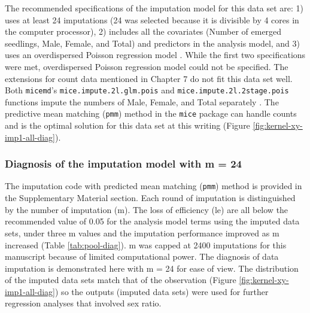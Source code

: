\documentclass[utf8]{frontiersSCNS}
\begin{document}
The recommended specifications of the imputation model for this data set are: 1) uses at least 24 imputations (24 was selected because it is divisible by 4 cores in the computer processor), 2) includes all the covariates (Number of emerged seedlings, Male, Female, and Total) and predictors in the analysis model, and 3) uses an overdispersed Poisson regression model \citetext{\citealp{azurMultipleImputationChained2011}; \citealp{whiteMultipleImputationUsing2011}; \citealp[and][]{nguyenModelCheckingMultiple2017}}. While the first two specifications were met, overdispersed Poisson regression model could not be specified. The extensions for count data mentioned in Chapter 7 \citep{vanbuurenFlexibleImputationMissing2018} do not fit this data set well. Both \texttt{micemd}'s \texttt{mice.impute.2l.glm.pois} and \texttt{mice.impute.2l.2stage.pois} functions impute the numbers of Male, Female, and Total separately \citep{audigierMicemdMultipleImputation2019}. The predictive mean matching (\texttt{pmm}) method in the \texttt{mice} package can handle counts \citep{vanbuurenMiceMultivariateImputation2011} and is the optimal solution for this data set at this writing (Figure \ref{fig:kernel-xy-imp1-all-diag}).

\hypertarget{diagnosis-of-the-imputation-model-with-m-24}{%
\subsubsection*{Diagnosis of the imputation model with m = 24}\label{diagnosis-of-the-imputation-model-with-m-24}}

The imputation code with predicted mean matching (\texttt{pmm}) method is provided in the Supplementary Material section. Each round of imputation is distinguished by the number of imputation (m). The loss of efficiency (le) are all below the recommended value of 0.05 \citep{whiteMultipleImputationUsing2011} for the analysis model terms using the imputed data sets, under three m values and the imputation performance improved as m increased (Table \ref{tab:pool-diag}). m was capped at 2400 imputations for this manuscript because of limited computational power. The diagnosis of data imputation is demonstrated here with m = 24 for ease of view. The distribution of the imputed data sets match that of the observation (Figure \ref{fig:kernel-xy-imp1-all-diag}) so the outputs (imputed data sets) were used for further regression analyses that involved sex ratio.
\end{document}
